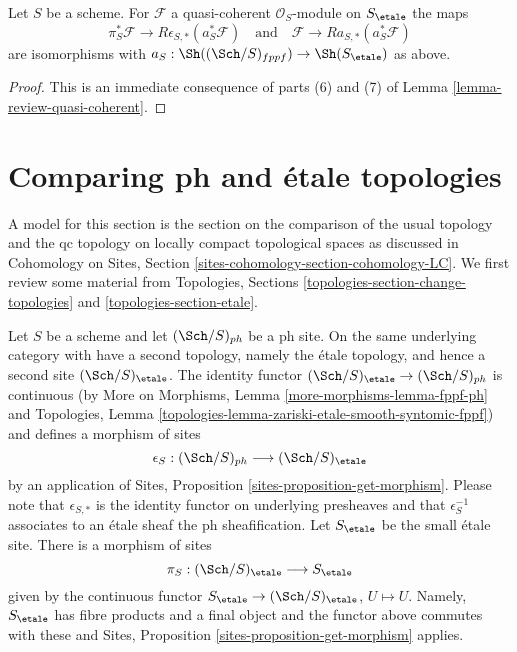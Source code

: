 \begin{lemma}
\label{lemma-cohomological-descent-etale-fppf-modules}
Let $S$ be a scheme. For $\mathcal{F}$ a quasi-coherent
$\mathcal{O}_S$-module on $S_\etale$ the maps
$$
\pi_S^*\mathcal{F} \longrightarrow R\epsilon_{S, *}(a_S^*\mathcal{F})
\quad\text{and}\quad
\mathcal{F} \longrightarrow Ra_{S, *}(a_S^*\mathcal{F})
$$
are isomorphisms with
$a_S : \Sh((\Sch/S)_{fppf}) \to \Sh(S_\etale)$ as above.
\end{lemma}

\begin{proof}
This is an immediate consequence of
parts (6) and (7) of
Lemma \ref{lemma-review-quasi-coherent}.
\end{proof}







\section{Comparing ph and \'etale topologies}
\label{section-ph-etale}

\noindent
A model for this section is the section on the comparison of the
usual topology and the qc topology on locally compact topological
spaces as discussed in Cohomology on Sites, Section
\ref{sites-cohomology-section-cohomology-LC}.
We first review some material from
Topologies, Sections
\ref{topologies-section-change-topologies} and
\ref{topologies-section-etale}.

\medskip\noindent
Let $S$ be a scheme and let $(\Sch/S)_{ph}$ be a ph site.
On the same underlying category with have a second topology,
namely the \'etale topology, and hence a second site
$(\Sch/S)_\etale$. The identity functor
$(\Sch/S)_\etale \to (\Sch/S)_{ph}$ is continuous
(by More on Morphisms, Lemma \ref{more-morphisms-lemma-fppf-ph}
and Topologies, Lemma
\ref{topologies-lemma-zariski-etale-smooth-syntomic-fppf})
and defines a morphism of sites
$$
\epsilon_S : (\Sch/S)_{ph} \longrightarrow (\Sch/S)_\etale
$$
by an application of Sites, Proposition \ref{sites-proposition-get-morphism}.
Please note that $\epsilon_{S, *}$ is the identity functor on underlying
presheaves and that $\epsilon_S^{-1}$ associates to an \'etale sheaf the
ph sheafification.
Let $S_\etale$ be the small \'etale site.
There is a morphism of sites
$$
\pi_S : (\Sch/S)_\etale \longrightarrow S_\etale
$$
given by the continuous functor
$S_\etale \to (\Sch/S)_\etale$, $U \mapsto U$.
Namely, $S_\etale$ has fibre products and a final object and the
functor above commutes with these and
Sites, Proposition \ref{sites-proposition-get-morphism} applies.

